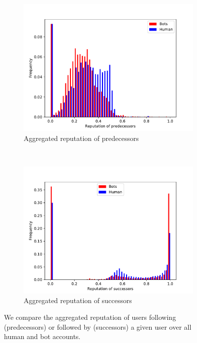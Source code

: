 \begin{figure}[t!]
    \centering
    \begin{subfigure}[t]{0.5\textwidth}
        \centering
        \includegraphics[width=\textwidth]{paper/FIG/reputation_pre.pdf}
        \caption{Aggregated reputation of predecessors}
    \end{subfigure}%
    ~ 
    \begin{subfigure}[t]{0.5\textwidth}
        \centering
        \includegraphics[width=\textwidth]{paper/FIG/reputation_succ.pdf}
        \caption{Aggregated reputation of successors}
    \end{subfigure}
    \caption{We compare the aggregated reputation of users following (predecessors) or followed by (successors) a given user over all human and bot accounts.}
    \label{fig:reputation}
\end{figure}

